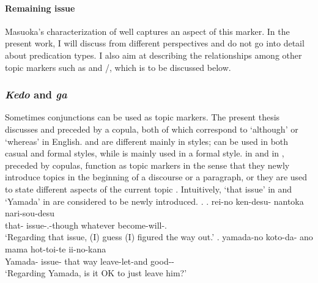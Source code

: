 


\paragraph{Remaining issue}

Masuoka's characterization of  well captures
an aspect of this marker.
In the present work, I will discuss  from different perspectives
and do not go into detail about predication types.
I also aim at describing the relationships among other topic markers
such as  and /,
which is to be discussed below.



\subsubsection{\textit{Kedo} and \textit{ga}}\label{BackSubSubKedo}

Sometimes conjunctions can be used as topic markers.
The present thesis discusses  and  preceded by a copula,
both of which correspond to `although' or `whereas' in English.
 and  are different mainly in styles;
 can be used in both casual and formal styles,
while  is mainly used in a formal style.
 in \Next[a] and  in \Next[b],
preceded by copulas,
function as topic markers in the sense that
they newly introduce topics in the beginning of a discourse or a paragraph, or
they are used to state different aspects of the current topic
\cite{koide84,takahashi99}.
Intuitively,
`that issue' in \Next[a] and `Yamada' in \Next[b]
are considered to be newly introduced.
%
\ex.
 \ag. rei-no ken-desu- nantoka nari-sou-desu \\
      that- issue-.-though whatever become-will-. \\
      `Regarding that issue, (I) guess (I) figured the way out.'
 \bg. yamada-no koto-da- ano mama hot-toi-te ii-no-kana \\
      Yamada- issue- that way leave-let-and good-- \\
      `Regarding Yamada, is it OK to just leave him?'
      \hfill{\cite[283]{niwa06}}


